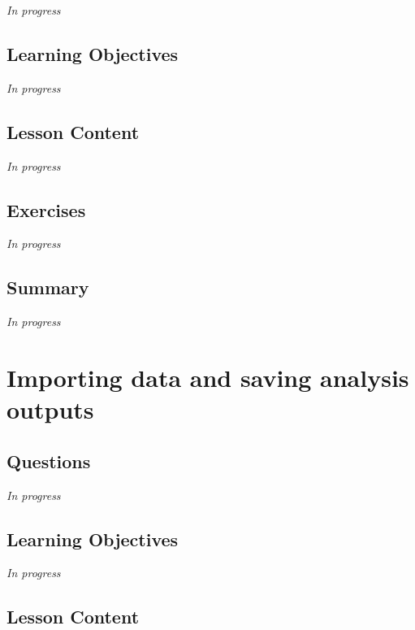 \documentclass[
  letterpaper,
  DIV=11,
  numbers=noendperiod]{scrreprt}
\begin{document}
\emph{In progress}

\hypertarget{learning-objectives-3}{%
\section{Learning Objectives}\label{learning-objectives-3}}

\emph{In progress}

\hypertarget{lesson-content-3}{%
\section{Lesson Content}\label{lesson-content-3}}

\emph{In progress}

\hypertarget{exercises-3}{%
\section{Exercises}\label{exercises-3}}

\emph{In progress}

\hypertarget{summary-4}{%
\section{Summary}\label{summary-4}}

\emph{In progress}


\hypertarget{sec-import-save}{%
\chapter{Importing data and saving analysis
outputs}\label{sec-import-save}}

\hypertarget{questions-4}{%
\section{Questions}\label{questions-4}}

\emph{In progress}

\hypertarget{learning-objectives-4}{%
\section{Learning Objectives}\label{learning-objectives-4}}

\emph{In progress}

\hypertarget{lesson-content-4}{%
\section{Lesson Content}\label{lesson-content-4}}
\end{document}
